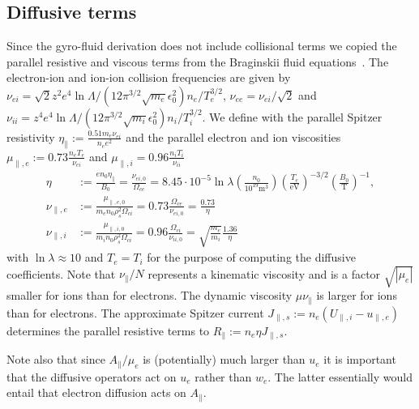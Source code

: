 \subsection{Diffusive terms}\label{sec:dissres}
Since the gyro-fluid derivation does not include collisional terms we
copied the parallel resistive and viscous terms from the Braginskii fluid equations~\cite{Braginskii1965}.
The electron-ion and ion-ion collision frequencies are given by
$\nu_{ei} = \sqrt{2} z^2 e^4 \ln \Lambda/ (12\pi^{3/2} \sqrt{m_e} \epsilon_0^2) n_e /T_e^{3/2}$, $\nu_{ee} = \nu_{ei}/\sqrt{2}$
and
$\nu_{ii} =  z^4 e^4 \ln \Lambda/ (12\pi^{3/2} \sqrt{m_i} \epsilon_0^2) n_i /T_i^{3/2}$.
We define with the parallel Spitzer resistivity
$\eta_\parallel := \frac{0.51 m_e \nu_{ei}}{n_e e^2}$ and the parallel electron and ion viscosities
$\mu_{\parallel,e}:=0.73\frac{n_eT_e}{\nu_{ei}}$ and $\mu_{\parallel,i} = 0.96\frac{n_iT_i}{\nu_{ii}}$~\cite{Braginskii1965}
\begin{subequations}
\begin{align}
    \eta&:=\frac{en_0\eta_\parallel}{B_0} = \frac{\nu_{ei,0}}{\Omega_{ce}}=
    8.45\cdot 10^{-5}\ln \lambda \left(\frac{n_0}{10^{19}\text{m}^3}\right)
    \left(\frac{T_e}{\text{eV}}\right)^{-3/2}
    \left(\frac{B_0}{\text{T}}\right)^{-1},
    \label{eq:resistivity}\\
    \nu_{\parallel,e}&:=\frac{\mu_{\parallel,e,0}}{m_e n_0\rho_s^2\Omega_{ci}}
    = 0.73 \frac{\Omega_{ce}}{\nu_{ei,0}} = \frac{0.73}{\eta}
    \label{eq:nu_parallele}\\
    \nu_{\parallel,i}&:=\frac{\mu_{\parallel,i,0}}{m_i n_0 \rho_s^2\Omega_{ci}}
    = 0.96 \frac{\Omega_{ci}}{\nu_{ii,0}} = \sqrt{\frac{m_e}{m_i}}
    \frac{1.36}{\eta}
    \label{eq:nu_paralleli}
\end{align}
\end{subequations}
with $\ln \lambda \approx 10$ and $T_e=T_i$ for the purpose of computing the diffusive coefficients. Note that $\nu_\parallel/N$ represents a kinematic viscosity and is a factor $\sqrt{|\mu_e|}$ smaller for ions than for electrons.
The dynamic viscosity $\mu\nu_\parallel$ is larger for ions than for electrons.
 The approximate Spitzer current \(J_{\parallel,s}:= n_e \left(U_{\parallel,i} - u_{\parallel,e}\right)\)
 determines the parallel resistive terms to $R_\parallel:= n_e\eta J_{\parallel,s}$.

 Note also that since $A_\parallel/\mu_e$ is (potentially) much larger than $u_e$
 it is important that the diffusive operators act on $u_e$ rather than $w_e$.
 The latter essentially would entail that electron diffusion acts on $A_\parallel$.

